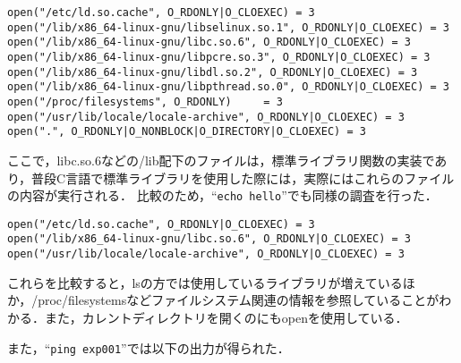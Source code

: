 \documentclass[a4j,10pt,titlepage]{jsarticle}
\begin{document}
\begin{verbatim}
open("/etc/ld.so.cache", O_RDONLY|O_CLOEXEC) = 3
open("/lib/x86_64-linux-gnu/libselinux.so.1", O_RDONLY|O_CLOEXEC) = 3
open("/lib/x86_64-linux-gnu/libc.so.6", O_RDONLY|O_CLOEXEC) = 3
open("/lib/x86_64-linux-gnu/libpcre.so.3", O_RDONLY|O_CLOEXEC) = 3
open("/lib/x86_64-linux-gnu/libdl.so.2", O_RDONLY|O_CLOEXEC) = 3
open("/lib/x86_64-linux-gnu/libpthread.so.0", O_RDONLY|O_CLOEXEC) = 3
open("/proc/filesystems", O_RDONLY)     = 3
open("/usr/lib/locale/locale-archive", O_RDONLY|O_CLOEXEC) = 3
open(".", O_RDONLY|O_NONBLOCK|O_DIRECTORY|O_CLOEXEC) = 3
\end{verbatim}

ここで，libc.so.6などの/lib配下のファイルは，標準ライブラリ関数の実装であり，普段C言語で標準ライブラリを使用した際には，実際にはこれらのファイルの内容が実行される．
比較のため，``\verb|echo hello|''でも同様の調査を行った．

\begin{verbatim}
open("/etc/ld.so.cache", O_RDONLY|O_CLOEXEC) = 3
open("/lib/x86_64-linux-gnu/libc.so.6", O_RDONLY|O_CLOEXEC) = 3
open("/usr/lib/locale/locale-archive", O_RDONLY|O_CLOEXEC) = 3
\end{verbatim}

これらを比較すると，lsの方では使用しているライブラリが増えているほか，/proc/filesystemsなどファイルシステム関連の情報を参照していることがわかる．また，カレントディレクトリを開くのにもopenを使用している．

また，``\verb|ping exp001|''では以下の出力が得られた．
\end{document}
